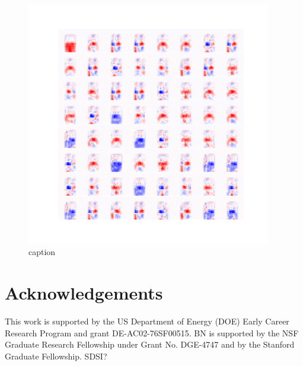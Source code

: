 \documentclass{article}
\begin{document}
\begin{figure}[htbp]
  \centering
  \includegraphics[width=0.95\textwidth]{figures/conv-diffs-ben-window.pdf}
  \caption{caption}
  \label{fig:convkernelsWindow}
\end{figure}








\section{Acknowledgements}

This work is supported by the US Department of Energy (DOE) Early Career Research Program and grant DE-AC02-76SF00515. BN is supported by the NSF Graduate Research Fellowship under Grant No. DGE-4747 and by the Stanford Graduate Fellowship.  SDSI?




% 
\end{document}
